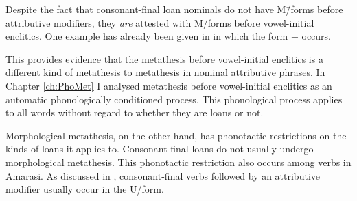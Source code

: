 Despite the fact that consonant-final loan nominals
do not have M\=/forms before attributive modifiers,
they \emph{are} attested with M\=/forms before vowel-initial enclitics.
One example has already been given in 
in which the form  {\la}  +  occurs.

This provides evidence that the metathesis before vowel-initial enclitics
is a different kind of metathesis to metathesis in nominal attributive phrases.
In Chapter \ref{ch:PhoMet} I analysed metathesis before vowel-initial enclitics
as an automatic phonologically conditioned process.
This phonological process applies to all words without regard to whether they are loans or not.

Morphological metathesis, on the other hand, has phonotactic
restrictions on the kinds of loans it applies to.
Consonant-final loans do not usually undergo morphological metathesis.
This phonotactic restriction also occurs among verbs in Amarasi.
As discussed in , consonant-final verbs
followed by an attributive modifier usually occur in the U\=/form.
